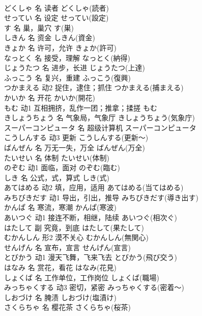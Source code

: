 \documentclass[8pt]{extreport}
\begin{document}
\begin{CJK}{UTF8}{min}
\\	どくしゃ	名	读者	どくしゃ(読者)	
\\	せってい	名	设定	せってい(設定)	
\\	す	名	巢，巢穴	す(巣)	
\\	しきん	名	资金	しきん(資金)	
\\	きょか	名	许可，允许	きょか(許可)	
\\	なっとく	名	接受，理解	なっとく(納得)	
\\	じょうたつ	名	进步，长进	じょうたつ(上達)	
\\	ふっこう	名	复兴，重建	ふっこう(復興)	
\\	つかまえる	动2	捉住，逮住；抓住	つかまえる(捕まえる)	
\\	かいか	名	开花	かいか(開花)	
\\	もむ	动1	互相拥挤，乱作一团；推拿；揉搓	もむ	
\\	きしょうちょう	名	气象局，气象厅	きしょうちょう(気象庁)	
\\	スーパーコンピュータ	名	超级计算机	スーパーコンピュータ	
\\	こうしんする	动3	更新	こうしんする(更新～)	
\\	ばんぜん	名	万无一失，万全	ばんぜん(万全)	
\\	たいせい	名	体制	たいせい(体制)	
\\	のぞむ	动1	面临，面对	のぞむ(臨む)	
\\	しき	名	公式，式，算式	しき(式)	
\\	あてはめる	动2	填，应用，适用	あてはめる(当てはめる)	
\\	みちびきだす	动1	导出，引出，推导	みちびきだす(導き出す)	
\\	かんぱ	名	寒流，寒潮	かんぱ(寒波)	
\\	あいつぐ	动1	接连不断，相继，陆续	あいつぐ(相次ぐ)	
\\	はたして	副	究竟，到底	はたして(果たして)	
\\	むかんしん	形2	漠不关心	むかんしん(無関心)	
\\	せんげん	名	宣布，宣言	せんげん(宣言)	
\\	とびかう	动1	漫天飞舞，飞来飞去	とびかう(飛び交う)	
\\	はなみ	名	赏花，看花	はなみ(花見)	
\\	しょくば	名	工作单位，工作岗位	しょくば(職場)	
\\	みっちゃくする	动3	密切，紧密	みっちゃくする(密着～)	
\\	しおづけ	名	腌渍	しおづけ(塩漬け)	
\\	さくらちゃ	名	樱花茶	さくらちゃ(桜茶)	

\end{CJK}
\end{document}
